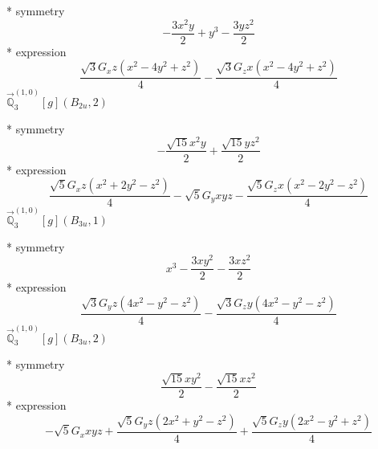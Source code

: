\documentclass[fleqn,8pt]{jsarticle}
\begin{document}
\noindent\quad ** symmetry
\begin{dmath*}
- \frac{3 x^{2} y}{2} + y^{3} - \frac{3 y z^{2}}{2}
\end{dmath*}
\noindent\quad ** expression
\begin{dmath*}
\frac{\sqrt{3} G_{x} z \left(x^{2} - 4 y^{2} + z^{2}\right)}{4} - \frac{\sqrt{3} G_{z} x \left(x^{2} - 4 y^{2} + z^{2}\right)}{4}
\end{dmath*}
\noindent\quad $\vec{\mathbb{Q}}_{3}^{(1,0)}[g](B_{2u},2)$

\noindent\quad ** symmetry
\begin{dmath*}
- \frac{\sqrt{15} x^{2} y}{2} + \frac{\sqrt{15} y z^{2}}{2}
\end{dmath*}
\noindent\quad ** expression
\begin{dmath*}
\frac{\sqrt{5} G_{x} z \left(x^{2} + 2 y^{2} - z^{2}\right)}{4} - \sqrt{5} G_{y} x y z - \frac{\sqrt{5} G_{z} x \left(x^{2} - 2 y^{2} - z^{2}\right)}{4}
\end{dmath*}
\noindent\quad $\vec{\mathbb{Q}}_{3}^{(1,0)}[g](B_{3u},1)$

\noindent\quad ** symmetry
\begin{dmath*}
x^{3} - \frac{3 x y^{2}}{2} - \frac{3 x z^{2}}{2}
\end{dmath*}
\noindent\quad ** expression
\begin{dmath*}
\frac{\sqrt{3} G_{y} z \left(4 x^{2} - y^{2} - z^{2}\right)}{4} - \frac{\sqrt{3} G_{z} y \left(4 x^{2} - y^{2} - z^{2}\right)}{4}
\end{dmath*}
\noindent\quad $\vec{\mathbb{Q}}_{3}^{(1,0)}[g](B_{3u},2)$

\noindent\quad ** symmetry
\begin{dmath*}
\frac{\sqrt{15} x y^{2}}{2} - \frac{\sqrt{15} x z^{2}}{2}
\end{dmath*}
\noindent\quad ** expression
\begin{dmath*}
- \sqrt{5} G_{x} x y z + \frac{\sqrt{5} G_{y} z \left(2 x^{2} + y^{2} - z^{2}\right)}{4} + \frac{\sqrt{5} G_{z} y \left(2 x^{2} - y^{2} + z^{2}\right)}{4}
\end{dmath*}
\end{document}
